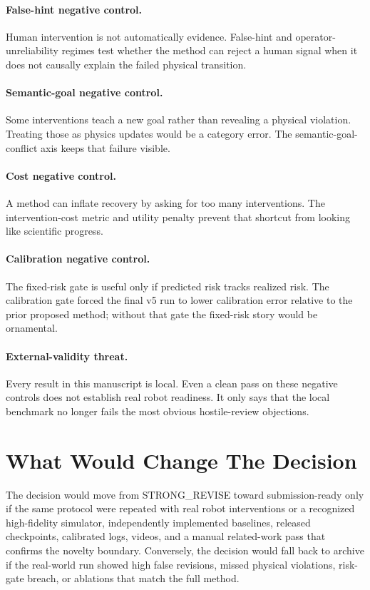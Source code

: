 \documentclass{article}
\begin{document}
\paragraph{False-hint negative control.} Human intervention is not automatically evidence. False-hint and operator-unreliability regimes test whether the method can reject a human signal when it does not causally explain the failed physical transition.

\paragraph{Semantic-goal negative control.} Some interventions teach a new goal rather than revealing a physical violation. Treating those as physics updates would be a category error. The semantic-goal-conflict axis keeps that failure visible.

\paragraph{Cost negative control.} A method can inflate recovery by asking for too many interventions. The intervention-cost metric and utility penalty prevent that shortcut from looking like scientific progress.

\paragraph{Calibration negative control.} The fixed-risk gate is useful only if predicted risk tracks realized risk. The calibration gate forced the final v5 run to lower calibration error relative to the prior proposed method; without that gate the fixed-risk story would be ornamental.

\paragraph{External-validity threat.} Every result in this manuscript is local. Even a clean pass on these negative controls does not establish real robot readiness. It only says that the local benchmark no longer fails the most obvious hostile-review objections.

\section{What Would Change The Decision}
The decision would move from STRONG\_REVISE toward submission-ready only if the same protocol were repeated with real robot interventions or a recognized high-fidelity simulator, independently implemented baselines, released checkpoints, calibrated logs, videos, and a manual related-work pass that confirms the novelty boundary. Conversely, the decision would fall back to archive if the real-world run showed high false revisions, missed physical violations, risk-gate breach, or ablations that match the full method.
\end{document}
